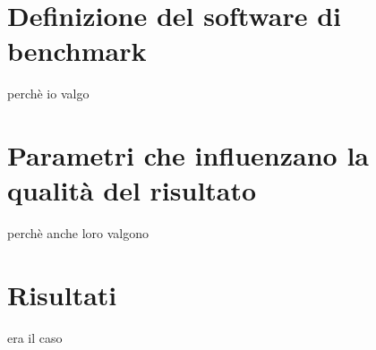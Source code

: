\section{Definizione del software di benchmark}
	perchè io valgo
	
\section{Parametri che influenzano la qualità del risultato}
	perchè anche loro valgono
	
\section{Risultati}
	era il caso

